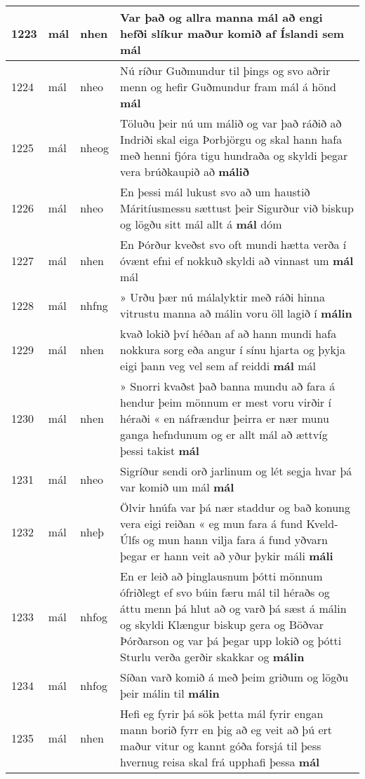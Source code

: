 \documentclass{article}
\begin{document}
\begin{longtable}{p{1cm}|p{1cm}|p{1cm}|p{13cm}}
\hline
1223&mál&nhen&Var það og allra manna mál að engi hefði slíkur maður komið af Íslandi sem \textbf{mál} \\
\hline
1224&mál&nheo&Nú ríður Guðmundur til þings og svo aðrir menn og hefir Guðmundur fram mál á hönd \textbf{mál} \\
\hline
1225&mál&nheog&Töluðu þeir nú um málið og var það ráðið að Indriði skal eiga Þorbjörgu og skal hann hafa með henni fjóra tigu hundraða og skyldi þegar vera brúðkaupið að \textbf{málið} \\
\hline
1226&mál&nheo&En þessi mál lukust svo að um haustið Máritíusmessu sættust þeir Sigurður við biskup og lögðu sitt mál allt á \textbf{mál} dóm\\
\hline
1227&mál&nhen&En Þórður kveðst svo oft mundi hætta verða í óvænt efni ef nokkuð skyldi að vinnast um \textbf{mál} mál\\
\hline
1228&mál&nhfng&» Urðu þær nú málalyktir með ráði hinna vitrustu manna að málin voru öll lagið í \textbf{málin} \\
\hline
1229&mál&nhen&kvað lokið því héðan af að hann mundi hafa nokkura sorg eða angur í sínu hjarta og þykja eigi þann veg vel sem af reiddi \textbf{mál} mál\\
\hline
1230&mál&nhen&» Snorri kvaðst það banna mundu að fara á hendur þeim mönnum er mest voru virðir í héraði « en náfrændur þeirra er nær munu ganga hefndunum og er allt mál að ættvíg þessi takist \textbf{mál} \\
\hline
1231&mál&nheo&Sigríður sendi orð jarlinum og lét segja hvar þá var komið um mál \textbf{mál} \\
\hline
1232&mál&nheþ&Ölvir hnúfa var þá nær staddur og bað konung vera eigi reiðan « eg mun fara á fund Kveld-Úlfs og mun hann vilja fara á fund yðvarn þegar er hann veit að yður þykir máli \textbf{máli} \\
\hline
1233&mál&nhfog&En er leið að þinglausnum þótti mönnum ófriðlegt ef svo búin færu mál til héraðs og áttu menn þá hlut að og varð þá sæst á málin og skyldi Klængur biskup gera og Böðvar Þórðarson og var þá þegar upp lokið og þótti Sturlu verða gerðir skakkar og \textbf{málin} \\
\hline
1234&mál&nhfog&Síðan varð komið á með þeim griðum og lögðu þeir málin til \textbf{málin} \\
\hline
1235&mál&nhen&Hefi eg fyrir þá sök þetta mál fyrir engan mann borið fyrr en þig að eg veit að þú ert maður vitur og kannt góða forsjá til þess hvernug reisa skal frá upphafi þessa \textbf{mál} \\

\end{longtable}
\end{document}
